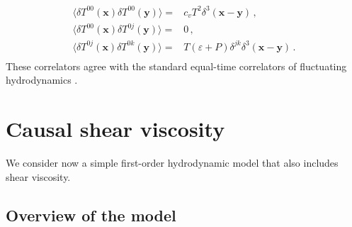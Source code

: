 \documentclass[a4paper, amsfonts, amssymb, amsmath, reprint, showkeys, nofootinbib, twoside,notitlepage,onecolumn,preprintnumbers]{revtex4-2}
\theoremstyle{definition}
\theoremstyle{theorem}
\theoremstyle{corollary}
\begin{document}
\begin{equation}
\begin{split}
    \langle \delta T^{00}(\textbf{x})\delta T^{00}(\textbf{y})\rangle ={}& c_v T^2 \delta^3(\textbf{x}-\textbf{y}) \, , \\ \langle \delta T^{00}(\textbf{x})\delta T^{0j}(\textbf{y})\rangle ={}& 0 \, ,\\   \langle \delta T^{0j}(\textbf{x})\delta T^{0k}(\textbf{y})\rangle ={}& T(\varepsilon{+}P) \delta^{jk}\delta^3(\textbf{x}-\textbf{y}) \, . \\
    \end{split}
\end{equation}
These correlators agree with the standard equal-time correlators of fluctuating hydrodynamics \cite{landau9}.



\section{Causal shear viscosity}\label{shearuzzuzuzuz}

We consider now a simple first-order hydrodynamic model that also includes shear viscosity.

\subsection{Overview of the model}
\end{document}
